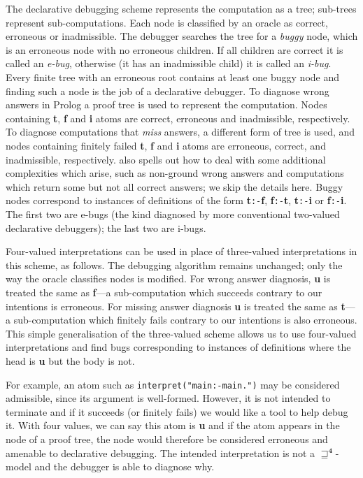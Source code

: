 \documentclass{tlp}
\newcommand{\Quad}{\ensuremath{\mathbf{4}}}
\begin{document}
The declarative debugging scheme represents the computation as a tree;
sub-trees represent sub-computations.  
Each node is classified by an oracle as correct, erroneous
or inadmissible.  The debugger searches the tree for a \emph{buggy}
node, which is an erroneous node with no erroneous children.
If all children are correct it is called an \emph{e-bug}, otherwise
(it has an inadmissible child) it is called an \emph{i-bug}.
Every finite tree
with an erroneous root contains at least one buggy node and finding such
a node is the job of a declarative debugger.
To diagnose wrong answers in Prolog a proof tree \cite{Llo84} is used to
represent the computation.  Nodes containing \textbf{t}, \textbf{f} and
\textbf{i} atoms are correct, erroneous and inadmissible, respectively.
To diagnose computations that \emph{miss} answers, a different form
of tree is used, and nodes containing finitely failed \textbf{t},
\textbf{f} and \textbf{i} atoms are erroneous, correct, and inadmissible,
respectively.   also spells out how to deal with some
additional complexities which arise, such as non-ground wrong answers
and computations which return some but not all correct answers; we skip
the details here.  Buggy nodes correspond to instances of definitions of
the form
\textbf{t}\texttt{:-}\textbf{f},
\textbf{f}\texttt{:-}\textbf{t},
\textbf{t}\texttt{:-}\textbf{i} or
\textbf{f}\texttt{:-}\textbf{i}.
The first two are e-bugs (the kind diagnosed by more conventional
two-valued declarative debuggers); the last two are i-bugs.

Four-valued interpretations can be used in place of three-valued
interpretations in this scheme, as follows.  The debugging algorithm remains
unchanged; only the way the oracle classifies nodes is modified.
For wrong answer diagnosis, \textbf{u} is treated the same
as \textbf{f}---a sub-computation which succeeds contrary to our
intentions is erroneous.  For missing answer diagnosis \textbf{u} is
treated the same as \textbf{t}---a sub-computation which finitely
fails contrary to our intentions is also erroneous.  This simple
generalisation of the three-valued scheme allows us to use four-valued
interpretations and
find bugs corresponding to instances of definitions where the head is
\textbf{u} but the body is not.

For example, an atom such as \texttt{interpret("main:-main.")} may be
considered admissible, since its argument is well-formed.  However,
it is not intended to terminate and if it succeeds (or finitely fails)
we would like a tool to help debug it.  With four values, we can say
this atom is \textbf{u} and if the atom appears in the node of a proof
tree, the node would therefore be considered erroneous and amenable to
declarative debugging.  The intended interpretation is not a
$\sqsupseteq^\Quad$-model and the debugger is able to diagnose why.
\end{document}
